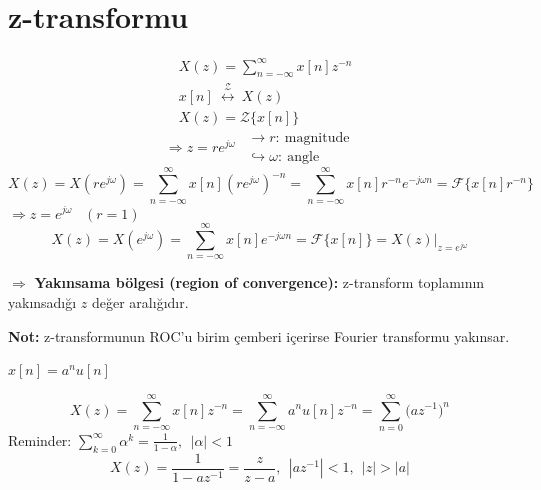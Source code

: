 \documentclass[11pt,a4paper]{article}
\begin{document}
\providecommand{\yalti}[1]{{\color{yesilkalem}\underline{\color{murekkep}#1}}}

\section{z-transformu}
\begin{align*}
  &X(z)=\sum_{n=-\infty}^{\infty}x[n]z^{-n}\\
  &x[n]\ \overset{\mathcal{Z}}{\longleftrightarrow}\ X(z)\\
  &X(z)=\mathcal{Z}\{x[n]\}
\end{align*}
\[
  \Rightarrow z=re^{j\omega}\ \
  \begin{array}{l}
    \longrightarrow r:\ \text{magnitude}\\
    \hookrightarrow \omega:\ \text{angle}
  \end{array}
\]
\[
  X(z)=X(re^{j\omega})=\sum_{n=-\infty}^{\infty}x[n](re^{j\omega})^{-n}=\sum_{n=-\infty}^{\infty}x[n]r^{-n}e^{-j\omega n}=\mathcal{F}\{x[n]r^{-n}\}
\]
$\Rightarrow z=e^{j\omega}$ \ $(r=1)$
\[
  X(z)=X(e^{j\omega})=\sum_{n=-\infty}^{\infty}x[n]e^{-j\omega n}=\mathcal{F}\{x[n]\}=X(z)\Big|_{z=e^{j\omega}}
\]
\begin{center}
\end{center}
$\Rightarrow$ \textbf{Yakınsama bölgesi (region of convergence):} z-transform toplamının yakınsadığı $z$ değer aralığıdır.

\textbf{Not:} z-transformunun ROC'u birim çemberi içerirse Fourier transformu yakınsar.

\begin{ornek}[]
  $x[n]=a^nu[n]$
\end{ornek}
\[
  X(z)=\sum_{n=-\infty}^{\infty}x[n]z^{-n}=\sum_{n=-\infty}^{\infty}a^nu[n]z^{-n}=\sum_{n=0}^{\infty}\bigl(az^{-1}\bigr)^n
\]
Reminder: \quad $\displaystyle\sum_{k=0}^{\infty}\alpha^k=\frac{1}{1-\alpha},\ \ |\alpha|<1$
\[
  X(z)=\frac{1}{1-az^{-1}}=\frac{z}{z-a},\ \ |az^{-1}|<1,\ \ |z|>|a|
\]
\end{document}
